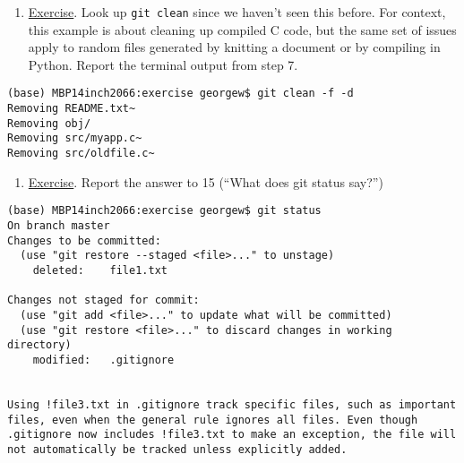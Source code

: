 \documentclass[
  letterpaper,
  DIV=11,
  numbers=noendperiod]{scrartcl}
\providecommand{\tightlist}{%
  \setlength{\itemsep}{0pt}\setlength{\parskip}{0pt}}\usepackage{longtable,booktabs,array}
\begin{document}
\begin{enumerate}
\def\labelenumi{\arabic{enumi}.}
\setcounter{enumi}{1}
\tightlist
\item
  \href{https://github.com/eficode-academy/git-katas/blob/master/basic-cleaning/README.md}{Exercise}.
  Look up \texttt{git\ clean} since we haven't seen this before. For
  context, this example is about cleaning up compiled C code, but the
  same set of issues apply to random files generated by knitting a
  document or by compiling in Python. Report the terminal output from
  step 7.
\end{enumerate}

\begin{verbatim}
(base) MBP14inch2066:exercise georgew$ git clean -f -d
Removing README.txt~
Removing obj/
Removing src/myapp.c~
Removing src/oldfile.c~
\end{verbatim}

\begin{enumerate}
\def\labelenumi{\arabic{enumi}.}
\setcounter{enumi}{2}
\tightlist
\item
  \href{https://github.com/eficode-academy/git-katas/blob/master/ignore/README.md}{Exercise}.
  Report the answer to 15 (``What does git status say?'')
\end{enumerate}

\begin{verbatim}
(base) MBP14inch2066:exercise georgew$ git status
On branch master
Changes to be committed:
  (use "git restore --staged <file>..." to unstage)
    deleted:    file1.txt

Changes not staged for commit:
  (use "git add <file>..." to update what will be committed)
  (use "git restore <file>..." to discard changes in working directory)
    modified:   .gitignore


Using !file3.txt in .gitignore track specific files, such as important files, even when the general rule ignores all files. Even though .gitignore now includes !file3.txt to make an exception, the file will not automatically be tracked unless explicitly added.
\end{verbatim}
\end{document}
